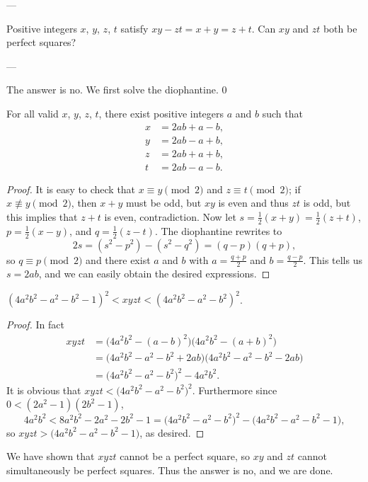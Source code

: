
---

Positive integers $x$, $y$, $z$, $t$ satisfy $xy-zt=x+y=z+t$. Can $xy$ and $zt$ both be perfect squares?

---

The answer is $\boxed{\text{no}}$. We first solve the diophantine.
\setcounter{iclaim}0
\begin{iclaim}
    For all valid $x$, $y$, $z$, $t$, there exist positive integers $a$ and $b$ such that
    \begin{align*}
        x&=2ab+a-b,\\
        y&=2ab-a+b,\\
        z&=2ab+a+b,\\
        t&=2ab-a-b.
    \end{align*}
\end{iclaim}
\begin{proof}
    It is easy to check that $x\equiv y\pmod2$ and $z\equiv t\pmod2$; if $x\not\equiv y\pmod2$, then $x+y$ must be odd, but $xy$ is even and thus $zt$ is odd, but this implies that $z+t$ is even, contradiction. Now let $s=\tfrac12(x+y)=\tfrac12(z+t)$, $p=\tfrac12(x-y)$, and $q=\tfrac12(z-t)$. The diophantine rewrites to $$2s=(s^2-p^2)-(s^2-q^2)=(q-p)(q+p),$$
    so $q\equiv p\pmod2$ and there exist $a$ and $b$ with $a=\tfrac{q+p}2$ and $b=\tfrac{q-p}2$. This tells us $s=2ab$, and we can easily obtain the desired expressions.
\end{proof}
\begin{iclaim}
    $(4a^2b^2-a^2-b^2-1)^2<xyzt<(4a^2b^2-a^2-b^2)^2$.
\end{iclaim}
\begin{proof}
    In fact
    \begin{align*}
        xyzt&=\big(4a^2b^2-(a-b)^2\big)\big(4a^2b^2-(a+b)^2\big)\\
        &=\big(4a^2b^2-a^2-b^2+2ab\big)\big(4a^2b^2-a^2-b^2-2ab\big)\\
        &=\big(4a^2b^2-a^2-b^2)^2-4a^2b^2.
    \end{align*}
    It is obvious that $xyzt<\big(4a^2b^2-a^2-b^2\big)^2$. Furthermore since $0<(2a^2-1)(2b^2-1)$, $$4a^2b^2<8a^2b^2-2a^2-2b^2-1=\big(4a^2b^2-a^2-b^2\big)^2-\big(4a^2b^2-a^2-b^2-1\big),$$
    so $xyzt>\big(4a^2b^2-a^2-b^2-1\big)$, as desired.
\end{proof}

We have shown that $xyzt$ cannot be a perfect square, so $xy$ and $zt$ cannot simultaneously be perfect squares. Thus the answer is no, and we are done. 
